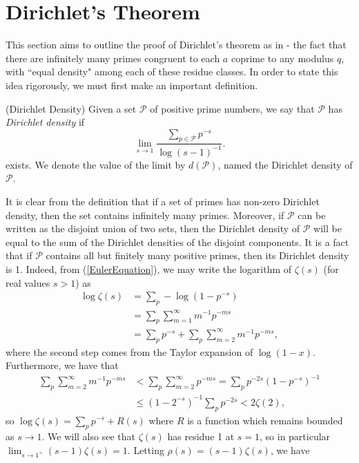 \section{Dirichlet's Theorem}
This section aims to outline the proof of Dirichlet's theorem as in \cite{ireland_rosen_1990} - the fact that there are infinitely many primes congruent to each $a$ coprime to any modulus $q$, with ``equal density" among each of these residue classes. In order to state this idea rigorously, we must first make an important definition. 
\begin{definition}
(Dirichlet Density) Given a set $\mathcal{P}$ of positive prime numbers, we say that $\mathcal{P}$ has \textit{Dirichlet density} if
\begin{equation}
   \lim_{s \rightarrow 1}\frac{\sum_{p \in \mathcal{P}}p^{-s}}{\log (s - 1)^{-1}}. \nonumber
\end{equation}
exists. We denote the value of the limit by $d(\mathcal{P})$, named the Dirichlet density of $\mathcal{P}$.
\end{definition}
It is clear from the definition that if a set of primes has non-zero Dirichlet density, then the set contains infinitely many primes. Moreover, if $\mathcal{P}$ can be written as the disjoint union of two sets, then the Dirichlet density of $\mathcal{P}$ will be equal to the sum of the Dirichlet densities of the disjoint components. It is a fact that if $\mathcal{P}$ contains all but finitely many positive primes, then its Dirichlet density is 1. Indeed, from (\ref{EulerEquation}), we may write the logarithm of $\zeta(s)$ (for real values $s > 1$) as 
\begin{align}
\label{logZeta}
    \log \zeta(s) &= \sum_{p} -\log(1 - p^{-s}) \nonumber \\
    &= \sum_{p} \sum_{m=1}^{\infty} m^{-1} p^{-ms} \nonumber \\
    &= \sum_{p} p^{-s} + \sum_{p} \sum_{m=2}^{\infty} m^{-1} p^{-ms}, 
\end{align}
where the second step comes from the Taylor expansion of $\log(1 - x)$. Furthermore, we have that 
\begin{align}
    \sum_{p}\sum_{m=2}^{\infty}m^{-1}p^{-ms} &< \sum_{p}\sum_{m=2}^{\infty}p^{-ms}
    = \sum_{p}p^{-2s}(1 - p^{-s})^{-1} \nonumber \\
    &\leq (1 - 2^{-s})^{-1}\sum_{p}p^{-2s} < 2\zeta(2), \nonumber
\end{align}
so $\log \zeta(s) = \sum_{p} p^{-s} + R(s)$ where $R$ is a function which remains bounded as $s \rightarrow 1$. We will also see that $\zeta(s)$ has residue 1 at $s = 1$, so in particular $\lim_{s \rightarrow 1^{+}}(s-1)\zeta(s) = 1$. Letting $\rho(s) = (s-1)\zeta(s)$, we have
